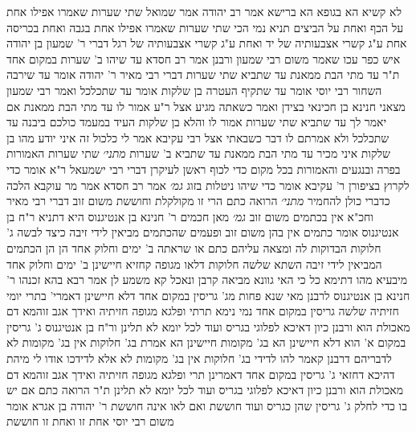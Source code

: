 \documentclass[12pt, openany]{book}
\begin{document}
{לא קשיא הא בגופא הא ברישא 
אמר רב יהודה אמר שמואל  שתי שערות שאמרו אפילו אחת על הכף ואחת על הביצים 
תניא נמי הכי  שתי שערות שאמרו אפילו אחת בגבה ואחת בכריסה אחת ע"ג קשרי אצבעותיה של יד ואחת ע"ג קשרי אצבעותיה של רגל דברי ר' שמעון בן יהודה איש כפר עכו שאמר משום רבי שמעון  ורבנן אמר רב חסדא  עד שיהו ב' שערות במקום אחד 
ת"ר  עד מתי הבת ממאנת  עד שתביא שתי שערות דברי רבי מאיר  ר' יהודה אומר  עד שירבה השחור  רבי יוסי אומר  עד שתקיף העטרה  בן שלקות אומר  עד שתכלכל 
ואמר רבי שמעון מצאני חנינא בן חכינאי בצידן ואמר  כשאתה מגיע אצל ר"ע אמור לו עד מתי הבת ממאנת  אם יאמר לך עד שתביא שתי שערות אמור לו והלא בן שלקות העיד במעמד כולכם ביבנה עד שתכלכל ולא אמרתם לו דבר 
כשבאתי אצל רבי עקיבא אמר לי  כלכול זה איני יודע מהו בן שלקות איני מכיר עד מתי הבת ממאנת עד שתביא ב' שערות
{\large\emph{מתני׳}} שתי שערות האמורות בפרה ובנגעים והאמורות בכל מקום כדי לכוף ראשן לעיקרן דברי רבי ישמעאל ר"א אומר כדי לקרוץ בציפורן ר' עקיבא אומר  כדי שיהו ניטלות בזוג
{\large\emph{גמ׳}} אמר רב חסדא אמר מר עוקבא הלכה כדברי כולן להחמיר
{\large\emph{מתני׳}} הרואה כתם הרי זו מקולקלת 
וחוששת משום זוב דברי רבי מאיר וחכ"א אין בכתמים משום זוב
{\large\emph{גמ׳}} מאן חכמים ר' חנינא בן אנטיגנוס היא דתניא ר"ח בן אנטיגנוס אומר  כתמים אין בהן משום זוב  ופעמים שהכתמים מביאין לידי זיבה 
כיצד לבשה ג' חלוקות הבדוקות לה ומצאה עליהם כתם או שראתה ב' ימים וחלוק אחד הן הן הכתמים המביאין לידי זיבה 
השתא שלשה חלוקות דלאו מגופה קחזיא חיישינן ב' ימים וחלוק אחד מיבעיא 
מהו דתימא כל כי האי גוונא מביאה קרבן ונאכל קא משמע לן 
אמר רבא בהא זכנהו ר' חנינא בן אנטיגנוס לרבנן  מאי שנא פחות מג' גריסין במקום אחד דלא חיישינן דאמרי'  בתרי יומי חזיתיה שלשה גריסין במקום אחד נמי נימא  תרתי ופלגא מגופה חזיתיה ואידך אגב זוהמא דם מאכולת הוא 
ורבנן כיון דאיכא לפלוגי בגריס ועוד לכל יומא לא תלינן 
ור"ח בן אנטיגנוס ג' גריסין במקום א' הוא דלא חיישינן הא בג' מקומות חיישינן  הא אמרת בג' חלוקות אין בג' מקומות לא 
לדבריהם דרבנן קאמר להו לדידי בג' חלוקות אין בג' מקומות לא  אלא לדידכו אודו לי מיהת דהיכא דחזאי ג' גריסין במקום אחד דאמרינן תרי ופלגא מגופה חזיתיה ואידך אגב זוהמא דם מאכולת הוא 
ורבנן כיון דאיכא לפלוגי בגריס ועוד לכל יומא לא תלינן 
ת"ר  הרואה כתם אם יש בו כדי לחלק ג' גריסין שהן כגריס ועוד חוששת ואם לאו אינה חוששת 
ר' יהודה בן אגרא אומר משום רבי יוסי  אחת זו ואחת זו חוששת}
\end{document}

